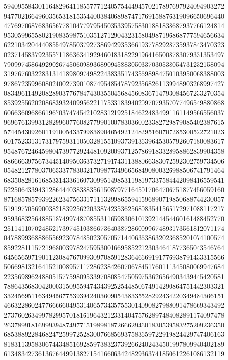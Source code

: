 {{    5940955843011648296411855777124057544494570217897697924094903272 ~
    9477021664960356531815354400384068987471769158876319096650696440 ~
    4776970687683656778104779795450353395758301881838687937766124814 ~
    9530599655802190835987510351271290432315804987196868777594656634 ~
    6221034204440855497850379273869429353661937782928735937843470323 ~
    0237145837923557118636341929460183182291964165008783079331353497 ~
    7909974586492902674506098936890945883050337030538054731232158094 ~
    3197676032283131418980974982243833517435698984750103950068388003 ~
    9786723599608024002739010874954854787923568261139948903268997427 ~
    0834961149208289037767847430355045684560836714793084567233270354 ~
    8539255620208683932409956221175331839402097079357077496549880868 ~
    6066360968661967037474542102831219251846224834991161149566556037 ~
    9696761399312829960776082779901007830360023382729879085402387615 ~
    5744543092601191005433799838904654921248295160707285300522721023 ~
    6017523313173179759311050328155109373913639645305792607180083617 ~
    9548767246459804739772924481092009371257869183328958862839904358 ~
    6866663975673445140950363732719174311388066383072592302759734506 ~
    0548212778037065337783032170987734966568490800326988506741791464 ~
    6835082816168533143361607309951498531198197337584442098416559541 ~
    5225064339431286444038388356150879771645017064706751877456059160 ~
    8716857857939226234756331711132998655941596890719850688744230057 ~
    5191977056900382183925622033874235362568083541565172971088117217 ~
    9593683256488518749974870855311659830610139214454460161488452770 ~
    2511411070248521739745103866736403872860099674893173561812071174 ~
    0478899368886556923078485023057057144063638632023685201074100574 ~
    8592281115721968003978247595300166958522123034641877365043546764 ~
    6456565971901123084767099309708591283646669191776938791433315566 ~
    5066981321641521008957117286238426070678451760111345080069947684 ~
    2235698962488051577598095339708085475059753626564903439445420581 ~
    7886435683042000315095594743439252544850674914290864751442303321 ~
    3324569511634945677539394240360905438335528292434220349484366151 ~
    4663228602477666660495314065734357553014090827988091478669343492 ~
    2737602634997829957018161964321233140475762897484082891174097478 ~
    2637899181699939487497715198981872666294601830539583275209236350 ~
    6853889228468247259972528300766856937583659722919824429747406163 ~
    8183113958306744348516928597383237392662402434501997809940402189 ~
    6134834273613676449913827154166063424829363741850612261086132119 ~
}}
